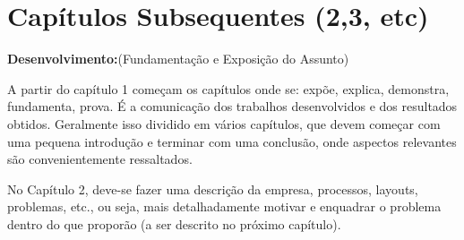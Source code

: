 \chapter{Capítulos Subsequentes (2,3, etc)}

\textbf{Desenvolvimento:}(Fundamentação e Exposição do Assunto)

A partir do capítulo 1 começam os capítulos onde se: expõe, explica, demonstra, fundamenta, prova. É a comunicação dos trabalhos desenvolvidos e dos resultados obtidos. Geralmente isso dividido em vários capítulos, que devem começar com uma pequena introdução e terminar com uma conclusão, onde aspectos relevantes são convenientemente ressaltados.

No Capítulo 2, deve-se fazer uma descrição da empresa, processos, layouts, problemas, etc., ou seja, mais detalhadamente motivar e enquadrar o problema dentro do que proporão (a ser descrito no próximo capítulo).
